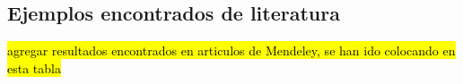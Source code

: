 \begin{multicols}{2}






 

\subsection{\textbf{\large{Ejemplos encontrados de literatura}}}

\hl{agregar resultados encontrados en articulos de Mendeley, se han ido colocando en esta tabla }

\begin{comment}

\section{\textbf{\large{Dificultades vistas en la desvulcanización}}}

\hl{esta parte de dificultades fue copiada de los articulos si se va a agregar cambiar redacción y ver donde se deberia agregar}


\subsection{\textbf{\large{Térmica}}}
El proceso térmico lleva a la ruptura aleatoria de los enlaces de azufre entrecruzados y de la cadena principal del polímero. La desvulcanización térmica también es problemática debido a la mayor estabilidad térmica y al aumento de la dureza debido al calentamiento (Seghar et al., 2019).


\end{comment}
\end{multicols}
